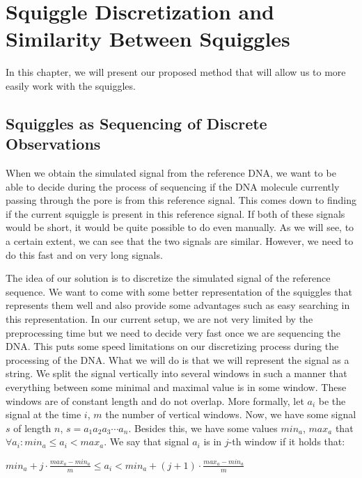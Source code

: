 \chapter{Squiggle Discretization and Similarity Between Squiggles}

\label{kap:proposedMethod} %

In this chapter, we will present our proposed method that will allow us to more
easily work with the squiggles.

\section{Squiggles as Sequencing of Discrete Observations}

When we obtain the simulated signal from the reference DNA, we want to be able
to decide during the process of sequencing if the DNA molecule currently passing
through the pore is from this reference signal. This comes down to finding if the
current squiggle is present in this reference signal. If both of these signals would
be short, it would be quite possible to do even manually. As we will see, to a
certain extent, we can see that the two signals are similar. However, we need to
do this fast and on very long signals.

The idea of our solution is to discretize the simulated signal of the
reference sequence. We want to come with some better representation of the
squiggles that represents them well and also provide some advantages such as
easy searching in this representation. In our current setup, we are
not very limited by the preprocessing time but we need to decide very fast once
we are sequencing the DNA. This puts some speed limitations on our discretizing
process during the processing of the DNA. What we will do is that we will
represent the signal as a string. We split the signal vertically into several
windows in such a manner that everything between some minimal and maximal
value is in some window. These windows are of constant length and do not
overlap. More formally, let $a_i$ be the signal at the time $i$, $m$ the number of
vertical windows. Now, we have some signal $s$ of length $n$, $s=a_1a_2a_3\cdots a_n$.
Besides this, we have some values $min_a$, $max_a$ that $\forall a_i: min_a \leq a_i < max_a$.
We say that signal $a_i$ is in $j$-th window if it holds that:

\begin{center}
$min_a + j\cdot \frac{max_a-min_a}{m} \leq a_i < min_a + (j+1)\cdot \frac{max_a-min_a}{m}$
\end{center}

